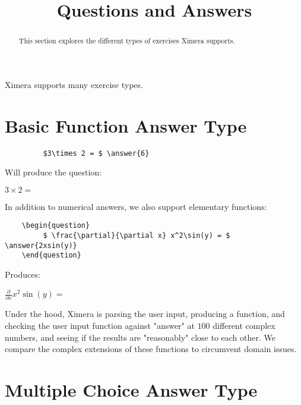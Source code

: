 \documentclass{ximera}
\title{Questions and Answers}
\begin{document}
	\begin{abstract}
		This section explores the different types of exercises Ximera supports. 
	\end{abstract}

\maketitle
	
Ximera supports many exercise types.
	
	
\section{Basic Function Answer Type}	
\begin{verbatim}
         $3\times 2 = $ \answer{6}
\end{verbatim}

Will produce the question:

\begin{question}
            $3\times 2 = $ 
\end{question}

In addition to numerical answers, we also support elementary functions:

\begin{verbatim}
    \begin{question}
         $ \frac{\partial}{\partial x} x^2\sin(y) = $ \answer{2xsin(y)}
    \end{question}
\end{verbatim}

Produces:

  \begin{question}
       $ \frac{\partial}{\partial x} x^2\sin(y) = $ 
  \end{question}
    
\begin{remark}
Under the hood, Ximera is parsing the user input, producing a function, and checking the user input function against "answer" at 
$100$ different complex numbers, and seeing if the results are "reasonably" close to each other.  
We compare the complex extensions of these functions to circumvent domain issues.
\end{remark}

\section{Multiple Choice Answer Type}
\end{document}
